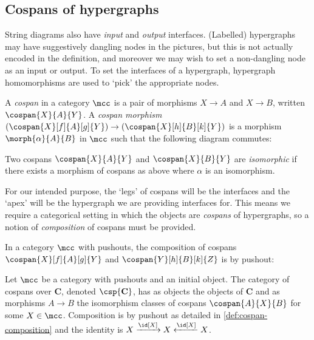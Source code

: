 \subsection{Cospans of hypergraphs}

String diagrams also have \emph{input} and \emph{output} interfaces.
(Labelled) hypergraphs may have suggestively dangling nodes in the pictures,
but this is not actually encoded in the definition, and moreover we may wish to
set a non-dangling node as an input or output.
To set the interfaces of a hypergraph, hypergraph homomorphisms are used
to `pick' the appropriate nodes.

\begin{definition}[Cospan]
    A \emph{cospan} in a category \(\mcc\) is a pair of morphisms \(X \to A\)
    and \(X \to B\), written \(\cospan{X}{A}{Y}\).
    A \emph{cospan morphism} \(
        (\cospan{X}[f]{A}[g]{Y}) \to (\cospan{X}[h]{B}[k]{Y})
    \) is a morphism \(\morph{\alpha}{A}{B}\) in \(\mcc\)
    such that the following diagram commutes:
    \begin{center}
        
    \end{center}
    Two cospans \(\cospan{X}{A}{Y}\) and \(\cospan{X}{B}{Y}\) are
    \emph{isomorphic} if there exists a morphism of cospans as above where
    \(\alpha\) is an isomorphism.
\end{definition}

For our intended purpose, the `legs' of cospans will be the interfaces and the
`apex' will be the hypergraph we are providing interfaces for.
This means we require a categorical setting in which the objects are
\emph{cospans} of hypergraphs, so a notion of \emph{composition} of cospans
must be provided.

\begin{definition}
    \label{def:cospan-composition}
    In a category \(\mcc\) with pushouts, the composition of cospans
    \(\cospan{X}[f]{A}[g]{Y}\) and \(\cospan{Y}[h]{B}[k]{Z}\) is by pushout:
    \begin{center}
        
    \end{center}
\end{definition}

\begin{definition}
    Let \(\mcc\) be a category with pushouts and an initial object.
    The category of cospans over \(\mathbf{C}\), denoted \(\csp{\mathbf{C}}\),
    has as objects the objects of \(\mathbf{C}\) and as morphisms \(A \to B\)
    the isomorphism classes of cospans \(\cospan{A}{X}{B}\) for some
    \(X \in \mcc\).
    Composition is by pushout as detailed in \cref{def:cospan-composition} and
    the identity is \(X \xrightarrow{\id[X]} X \xleftarrow{\id[X]} X\).
\end{definition}

